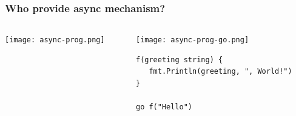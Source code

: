 \begin{frame}[fragile]	
    \frametitle{Who provide async mechanism?}
    \begin{columns}
        \begin{column}{.3\textwidth}

            \centering
            
            \texttt{[image: async-prog.png]}
            
            
        \end{column}
        
        \begin{column}{.7\textwidth}
            \centering
            \texttt{[image: async-prog-go.png]}
            
            \begin{block}{}
                \begin{verbatim}
f(greeting string) {
   fmt.Println(greeting, ", World!")
}

go f("Hello")
                \end{verbatim}
            \end{block}
            
        \end{column}
    \end{columns}
\end{frame}


